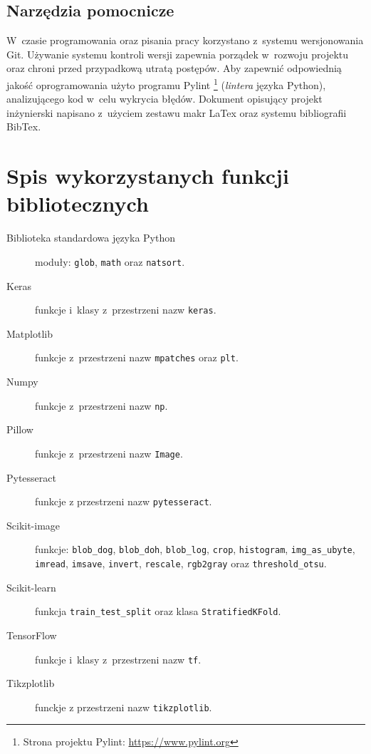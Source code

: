 \section{Narzędzia pomocnicze}
W~czasie programowania oraz pisania pracy korzystano z~systemu wersjonowania
Git.
Używanie systemu kontroli wersji zapewnia porządek w~rozwoju projektu oraz
chroni przed przypadkową utratą postępów.
Aby zapewnić odpowiednią jakość oprogramowania użyto programu Pylint%
\footnote{%
    Strona projektu Pylint: \url{https://www.pylint.org}}
(\emph{lintera} języka Python), analizującego kod w~celu wykrycia błędów.
Dokument opisujący projekt inżynierski napisano z~użyciem zestawu makr LaTex
oraz systemu bibliografii BibTex.

\chapter{Spis wykorzystanych funkcji bibliotecznych}
\begin{description}
    \item[Biblioteka standardowa języka Python] moduły: \texttt{glob},
          \texttt{math} oraz \texttt{natsort}.
    \item[Keras] funkcje i~klasy z~przestrzeni nazw \texttt{keras}.
    \item[Matplotlib] funkcje z~przestrzeni nazw \texttt{mpatches} oraz
          \texttt{plt}.
    \item[Numpy] funkcje z~przestrzeni nazw \texttt{np}.
    \item[Pillow] funkcje z~przestrzeni nazw \texttt{Image}.
    \item[Pytesseract] funkcje z przestrzeni nazw \texttt{pytesseract}.
    \item[Scikit-image] funkcje: \texttt{blob\_dog}, \texttt{blob\_doh},
          \texttt{blob\_log}, \texttt{crop}, \texttt{histogram},
          \texttt{img\_as\_ubyte}, \texttt{imread}, \texttt{imsave},
          \texttt{invert}, \texttt{rescale}, \texttt{rgb2gray} oraz
          \texttt{threshold\_otsu}.
    \item[Scikit-learn] funkcja \texttt{train\_test\_split} oraz klasa 
          \texttt{StratifiedKFold}.
    \item[TensorFlow] funkcje i~klasy z~przestrzeni nazw \texttt{tf}.
    \item[Tikzplotlib] funckje z przestrzeni nazw \texttt{tikzplotlib}.   
\end{description}
